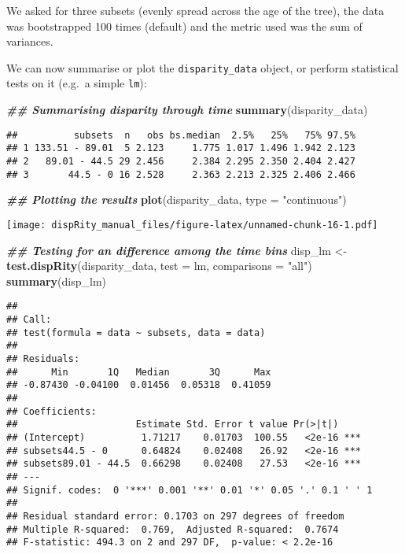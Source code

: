 \documentclass[
]{book}
\newenvironment{Shaded}{\begin{snugshade}}{\end{snugshade}}
\newcommand{\AttributeTok}[1]{\textcolor[rgb]{0.13,0.29,0.53}{#1}}
\newcommand{\DocumentationTok}[1]{\textcolor[rgb]{0.56,0.35,0.01}{\textbf{\textit{#1}}}}
\newcommand{\FunctionTok}[1]{\textcolor[rgb]{0.13,0.29,0.53}{\textbf{#1}}}
\newcommand{\NormalTok}[1]{#1}
\newcommand{\OtherTok}[1]{\textcolor[rgb]{0.56,0.35,0.01}{#1}}
\newcommand{\StringTok}[1]{\textcolor[rgb]{0.31,0.60,0.02}{#1}}
\begin{document}
We asked for three subsets (evenly spread across the age of the tree), the data was bootstrapped 100 times (default) and the metric used was the sum of variances.

We can now summarise or plot the \texttt{disparity\_data} object, or perform statistical tests on it (e.g.~a simple \texttt{lm}):

\begin{Shaded}
\begin{Highlighting}[]
\DocumentationTok{\#\# Summarising disparity through time}
\FunctionTok{summary}\NormalTok{(disparity\_data)}
\end{Highlighting}
\end{Shaded}

\begin{verbatim}
##          subsets  n   obs bs.median  2.5%   25%   75% 97.5%
## 1 133.51 - 89.01  5 2.123     1.775 1.017 1.496 1.942 2.123
## 2   89.01 - 44.5 29 2.456     2.384 2.295 2.350 2.404 2.427
## 3       44.5 - 0 16 2.528     2.363 2.213 2.325 2.406 2.466
\end{verbatim}

\begin{Shaded}
\begin{Highlighting}[]
\DocumentationTok{\#\# Plotting the results}
\FunctionTok{plot}\NormalTok{(disparity\_data, }\AttributeTok{type =} \StringTok{"continuous"}\NormalTok{)}
\end{Highlighting}
\end{Shaded}

\texttt{[image: dispRity\_manual\_files/figure-latex/unnamed-chunk-16-1.pdf]}

\begin{Shaded}
\begin{Highlighting}[]
\DocumentationTok{\#\# Testing for an difference among the time bins}
\NormalTok{disp\_lm }\OtherTok{\textless{}{-}} \FunctionTok{test.dispRity}\NormalTok{(disparity\_data, }\AttributeTok{test =}\NormalTok{ lm,}
                         \AttributeTok{comparisons =} \StringTok{"all"}\NormalTok{)}
\FunctionTok{summary}\NormalTok{(disp\_lm)}
\end{Highlighting}
\end{Shaded}

\begin{verbatim}
## 
## Call:
## test(formula = data ~ subsets, data = data)
## 
## Residuals:
##      Min       1Q   Median       3Q      Max 
## -0.87430 -0.04100  0.01456  0.05318  0.41059 
## 
## Coefficients:
##                     Estimate Std. Error t value Pr(>|t|)    
## (Intercept)          1.71217    0.01703  100.55   <2e-16 ***
## subsets44.5 - 0      0.64824    0.02408   26.92   <2e-16 ***
## subsets89.01 - 44.5  0.66298    0.02408   27.53   <2e-16 ***
## ---
## Signif. codes:  0 '***' 0.001 '**' 0.01 '*' 0.05 '.' 0.1 ' ' 1
## 
## Residual standard error: 0.1703 on 297 degrees of freedom
## Multiple R-squared:  0.769,  Adjusted R-squared:  0.7674 
## F-statistic: 494.3 on 2 and 297 DF,  p-value: < 2.2e-16
\end{verbatim}
\end{document}
